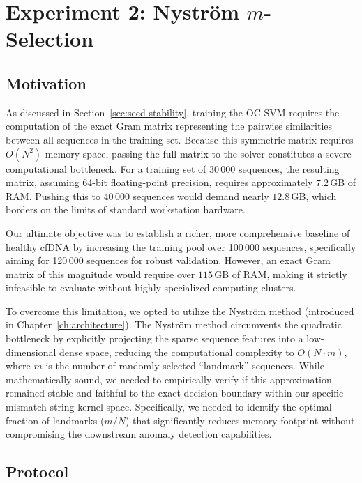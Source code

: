 \section{Experiment 2: Nystr\"{o}m $m$-Selection}\label{sec:nystrom-m-selection}

\subsection{Motivation}\label{sec:nystrom-motivation}

As discussed in Section~\ref{sec:seed-stability}, training the OC-SVM requires the computation of the exact Gram matrix representing the pairwise similarities between all sequences in the training set. 
Because this symmetric matrix requires $O(N^2)$ memory space, passing the full matrix to the solver constitutes a severe computational bottleneck. 
For a training set of 30\,000 sequences, the resulting matrix, assuming 64-bit floating-point precision, requires approximately $7.2$\,GB of RAM. 
Pushing this to 40\,000 sequences would demand nearly $12.8$\,GB, which borders on the limits of standard workstation hardware. 

Our ultimate objective was to establish a richer, more comprehensive baseline of healthy cfDNA by increasing the training pool over 100\,000 sequences, specifically aiming for 120\,000 sequences for robust validation. 
However, an exact Gram matrix of this magnitude would require over $115$\,GB of RAM, making it strictly infeasible to evaluate without highly specialized computing clusters. 

To overcome this limitation, we opted to utilize the Nystr\"{o}m method (introduced in Chapter~\ref{ch:architecture}). 
The Nystr\"{o}m method circumvents the quadratic bottleneck by explicitly projecting the sparse sequence features into a low-dimensional dense space, reducing the computational complexity to $O(N \cdot m)$, where $m$ is the number of randomly selected ``landmark'' sequences. 
While mathematically sound, we needed to empirically verify if this approximation remained stable and faithful to the exact decision boundary within our specific mismatch string kernel space. 
Specifically, we needed to identify the optimal fraction of landmarks ($m/N$) that significantly reduces memory footprint without compromising the downstream anomaly detection capabilities.

\subsection{Protocol}\label{sec:nystrom-protocol}

